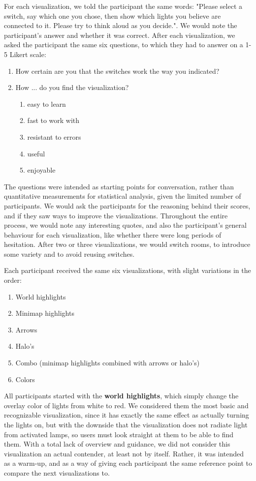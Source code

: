 For each visualization, we told the participant the same words: "Please select a switch, say which one you chose, then show which lights you believe are connected to it. Please try to think aloud as you decide.". We would note the participant's answer and whether it was correct. After each visualization, we asked the participant the same six questions, to which they had to answer on a 1-5 Likert scale:
\begin{enumerate}
  \item How certain are you that the switches work the way you indicated?
  \item How ... do you find the visualization?
  \begin{enumerate}
    \item easy to learn
    \item fast to work with
    \item resistant to errors
    \item useful
    \item enjoyable
  \end{enumerate}
\end{enumerate}

The questions were intended as starting points for conversation, rather than quantitative measurements for statistical analysis, given the limited number of participants. We would ask the participants for the reasoning behind their scores, and if they saw ways to improve the visualizations. Throughout the entire process, we would note any interesting quotes, and also the participant's general behaviour for each visualization, like whether there were long periods of hesitation. After two or three visualizations, we would switch rooms, to introduce some variety and to avoid reusing switches.

Each participant received the same six visualizations, with slight variations in the order:
\begin{enumerate}
  \item World highlights
  \item Minimap highlights
  \item Arrows
  \item Halo's
  \item Combo (minimap highlights combined with arrows or halo's)
  \item Colors
\end{enumerate}

All participants started with the \textbf{world highlights}, which simply change the overlay color of lights from white to red. We considered them the most basic and recognizable visualization, since it has exactly the same effect as actually turning the lights on, but with the downside that the visualization does not radiate light from activated lamps, so users must look straight at them to be able to find them. With a total lack of overview and guidance, we did not consider this visualization an actual contender, at least not by itself. Rather, it was intended as a warm-up, and as a way of giving each participant the same reference point to compare the next visualizations to.

